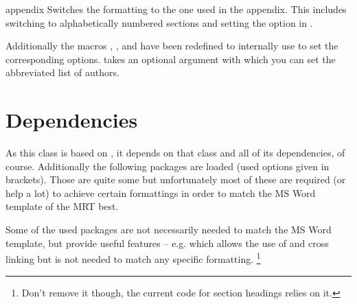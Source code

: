 \begin{describemacro}{appendix}
  Switches the formatting to the one used in the appendix. This includes
  switching to alphabetically numbered sections and setting the option  in .
\end{describemacro}
Additionally the macros , , and  have been
redefined to internally use  to set the corresponding
options.  takes an optional argument with which you can set the
abbreviated list of authors.

\section{Dependencies}\label{sec:thesis:dep}%
As this class is based on , it depends on that class and all of
its dependencies, of course. Additionally the following packages are loaded
(used options given in brackets). Those are quite some but unfortunately most of
these are required (or help a lot) to achieve certain formattings in order to
match the MS Word template of the MRT best.

Some of the used packages are not necessarily needed to match the MS Word
template, but provide useful features -- e.g.   which allows the
use of  and cross linking but is not needed to match any specific
formatting.%
\footnote
  {Don't remove it though, the current code for section headings relies on it.}


